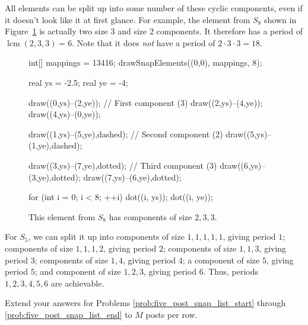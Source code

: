 \documentclass[../gatm_answers.tex]{subfiles}
\begin{document}
All elements can be split up into some number of these cyclic components, even if it doesn't look like it at first glance. For example, the element from $S_8$ shown in Figure~\ref{fig:period_8_elem} is actually two size $3$ and size $2$ components. It therefore has a period of $\operatorname{lcm}(2,3,3)=6$. Note that it does \textit{not} have a period of $2\cdot 3\cdot 3 = 18$.

\begin{figure}[h]
	\begin{center}
		\begin{minipage}[b]{\textwidth}
			\centering
			\begin{asy}[width=0.3\textwidth]
				int[] mappings = {13416};
				drawSnapElements((0,0), mappings, 8);
				
				real ys = -2.5;
				real ye = -4;
				
				draw((0,ys)--(2,ye)); // First component (3)
				draw((2,ys)--(4,ye));
				draw((4,ys)--(0,ye));
				
				draw((1,ys)--(5,ye),dashed); // Second component (2)
				draw((5,ys)--(1,ye),dashed);
				
				draw((3,ys)--(7,ye),dotted); // Third component (3)
				draw((6,ys)--(3,ye),dotted);
				draw((7,ys)--(6,ye),dotted);
				
				for (int i = 0; i < 8; ++i) {
					dot((i, ys));
					dot((i, ye));
				}
			\end{asy}
		\end{minipage}
	\end{center}
	\vspace*{-2\baselineskip}
	\begin{center}
		\begin{minipage}[t]{\textwidth}
			\caption{This element from $S_8$ has components of size $2,3,3$.}
			\label{fig:period_8_elem}
		\end{minipage}
	\end{center}
	\vspace*{-2\baselineskip}
\end{figure}

\noindent For $S_5$, we can split it up into components of size $1,1,1,1,1$, giving period $1$; components of size $1,1,1,2$, giving period $2$; components of size $1,1,3$, giving period $3$; components of size $1,4$, giving period $4$; a component of size $5$, giving period $5$; and component of size $1,2,3$, giving period $6$. Thus, periods $1,2,3,4,5,6$ are achievable.

\begin{inner_problem}
\item Extend your answers for Problems \ref{prob:five_post_snap_list_start} through \ref{prob:five_post_snap_list_end} to $M$ posts per row.
\end{inner_problem}
\end{document}
